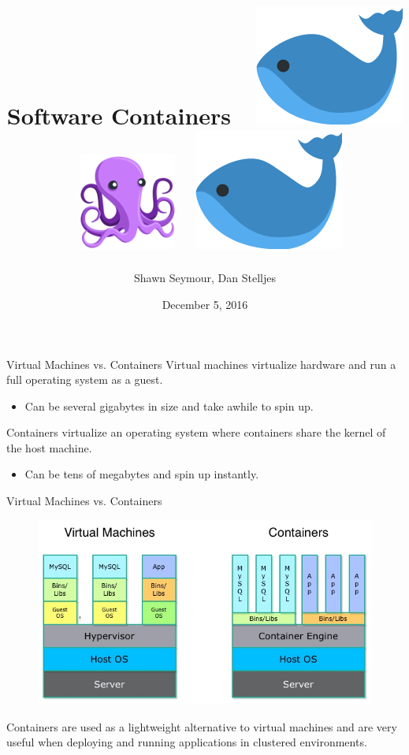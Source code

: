 \documentclass[xcolor=dvipsnames,aspectratio=1610]{beamer}
\title{Software Containers\ \
\includegraphics[scale=0.1]{whale.png}
\ \includegraphics[scale=0.15]{octopus.png}
\ \includegraphics[scale=0.1]{whale.png}}
\date{December 5, 2016}
\author{Shawn Seymour, Dan Stelljes}
\begin{document}
  \maketitle
  \begin{frame}{Virtual Machines vs. Containers}
      \alert{Virtual machines} virtualize hardware and run a full operating system as a guest.
      \begin{itemize}
          \item Can be several gigabytes in size and take awhile to spin up.
      \end{itemize}
      \vspace{10px}

      \alert{Containers} virtualize an operating system where containers share the kernel of the host machine.
      \begin{itemize}
          \item Can be tens of megabytes and spin up instantly.
      \end{itemize}

  \end{frame}

  \begin{frame}{Virtual Machines vs. Containers}
      \begin{figure}
        \includegraphics[scale=0.5]{container_vs_vm.jpg}
      \end{figure}
      Containers are used as a lightweight alternative to virtual machines and are very useful when deploying and running applications in clustered environments.

    \end{frame}
\end{document}
